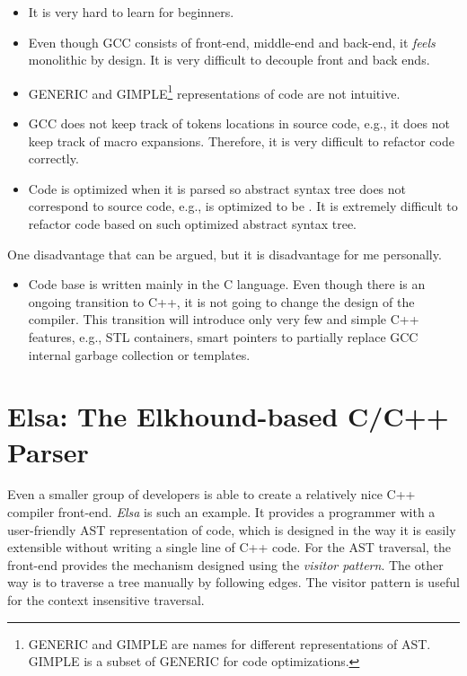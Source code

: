 \begin{itemize}
\item It is very hard to learn for beginners.

\item Even though GCC consists of front-end, middle-end and back-end, it \textit{feels} monolithic by design. It is very difficult to decouple front and back ends.

\item GENERIC and GIMPLE\footnote{GENERIC and GIMPLE are names for different representations of AST. GIMPLE is a subset of GENERIC for code optimizations.} representations of code are not intuitive.

\item GCC does not keep track of tokens locations in source code, e.g., it does not keep track of macro expansions. Therefore, it is very difficult to refactor code correctly.

\item Code is optimized when it is parsed so abstract syntax tree does not correspond to source code, e.g.,  is optimized to be . It is extremely difficult to refactor code based on such optimized abstract syntax tree.
\end{itemize}

One disadvantage that can be argued, but it is disadvantage for me personally.

\begin{itemize}
\item Code base is written mainly in the C language. Even though there is an ongoing transition to C++, it is not going to change the design of the compiler. This transition will introduce only very few and simple C++ features, e.g., STL containers, smart pointers to partially replace GCC internal garbage collection or templates.
\end{itemize}

\section{Elsa: The Elkhound-based C/C++ Parser}
Even a smaller group of developers is able to create a relatively nice C++ compiler front-end. \emph{Elsa} \cite{elsa} is such an example. It provides a programmer with a user-friendly AST representation of code, which is designed in the way it is easily extensible without writing a single line of C++ code. For the AST traversal, the front-end provides the mechanism designed using the \emph{visitor pattern}. The other way is to traverse a tree manually by following edges. The visitor pattern is useful for the context insensitive traversal.

